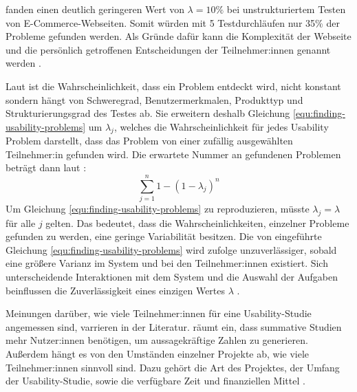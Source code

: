 \textcite{spoolTestingWeb2001} fanden einen deutlich geringeren Wert von $\lambda{}=10\%$ bei unstrukturiertem Testen von E-Commerce-Webseiten. Somit würden mit 5 Testdurchläufen nur 35\% der Probleme gefunden werden. Als Gründe dafür kann die Komplexität der Webseite und die persönlich getroffenen Entscheidungen der Teilnehmer:innen genannt werden \parencite{spoolTestingWeb2001}.

Laut \textcite{woolrychWhyWhen2001} ist die Wahrscheinlichkeit, dass ein Problem entdeckt wird, nicht konstant sondern hängt von Schweregrad, Benutzermerkmalen, Produkttyp und Strukturierungsgrad des Testes ab. Sie erweitern deshalb Gleichung \ref{equ:finding-usability-problems} um $\lambda{}_j$, welches die Wahrscheinlichkeit für jedes Usability Problem darstellt, dass das Problem von einer zufällig ausgewählten Teilnehmer:in gefunden wird. Die erwartete Nummer an gefundenen Problemen beträgt dann laut \textcite{woolrychWhyWhen2001}:
\begin{equation}
  \sum_{j=1}^n 1-(1-\lambda{}_j)^n
\end{equation}
Um Gleichung \ref{equ:finding-usability-problems} zu reproduzieren, müsste $\lambda{}_j = \lambda{}$ für alle $j$ gelten. Das bedeutet, dass die Wahrscheinlichkeiten, einzelner Probleme gefunden zu werden, eine geringe Variabilität besitzen. Die von \textcite{nielsenMathematicalModel1993} eingeführte Gleichung \ref{equ:finding-usability-problems} wird \textcite{woolrychWhyWhen2001} zufolge unzuverlässiger, sobald eine größere Varianz im System und bei den Teilnehmer:innen existiert. Sich unterscheidende Interaktionen mit dem System und die Auswahl der Aufgaben beinflussen die Zuverlässigkeit eines einzigen Wertes $\lambda{}$ \parencite{woolrychWhyWhen2001}.

Meinungen darüber, wie viele Teilnehmer:innen für eine Usability-Studie angemessen sind, varrieren in der Literatur. \textcite{nielsenHowMany2012} räumt ein, dass summative Studien mehr Nutzer:innen benötigen, um aussagekräftige Zahlen zu generieren. Außerdem hängt es von den Umständen einzelner Projekte ab, wie viele Teilnehmer:innen sinnvoll sind. Dazu gehört die Art des Projektes, der Umfang der Usability-Studie, sowie die verfügbare Zeit und finanziellen Mittel \parencite{nielsenHowMany2012}.
